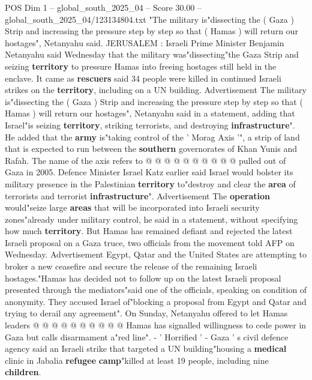 \begin{textsample}{POS Dim 1 – global\_south\_2025\_04 – Score 30.00 – global\_south\_2025\_04/123134804.txt}  \label{ex:f1_pos_284}
"The military is"dissecting the ( Gaza ) Strip and increasing the pressure step by step so that ( Hamas ) will return our hostages", Netanyahu said.
JERUSALEM : Israeli Prime Minister Benjamin Netanyahu said Wednesday that the military was"dissecting"the Gaza Strip and seizing \textbf{territory} to pressure Hamas into freeing hostages still held in the enclave.
It came as \textbf{rescuers} said 34 people were killed in continued Israeli strikes on the \textbf{territory}, including on a UN building.
Advertisement The military is"dissecting the ( Gaza ) Strip and increasing the pressure step by step so that ( Hamas ) will return our hostages", Netanyahu said in a statement, adding that Israel"is seizing \textbf{territory}, striking terrorists, and destroying \textbf{infrastructure}".
He added that the \textbf{army} is"taking control of the ' Morag Axis '", a strip of land that is expected to run between the \textbf{southern} governorates of Khan Yunis and Rafah.
The name of the axis refers to @ @ @ @ @ @ @ @ @ @ pulled out of Gaza in 2005.
Defence Minister Israel Katz earlier said Israel would bolster its military presence in the Palestinian \textbf{territory} to"destroy and clear the \textbf{area} of terrorists and terrorist \textbf{infrastructure}".
Advertisement The \textbf{operation} would"seize large \textbf{areas} that will be incorporated into Israeli security zones"already under military control, he said in a statement, without specifying how much \textbf{territory}.
But Hamas has remained defiant and rejected the latest Israeli proposal on a Gaza truce, two officials from the movement told AFP on Wednesday.
Advertisement Egypt, Qatar and the United States are attempting to broker a new ceasefire and secure the release of the remaining Israeli hostages."Hamas has decided not to follow up on the latest Israeli proposal presented through the mediators"said one of the officials, speaking on condition of anonymity.
They accused Israel of"blocking a proposal from Egypt and Qatar and trying to derail any agreement".
On Sunday, Netanyahu offered to let Hamas leaders @ @ @ @ @ @ @ @ @ @ Hamas has signalled willingness to cede power in Gaza but calls disarmament a"red line". - ' Horrified ' - Gaza ' s civil defence agency said an Israeli strike that targeted a UN building"housing a \textbf{medical} clinic in Jabalia \textbf{refugee} \textbf{camp}"killed at least 19 people, including nine \textbf{children}.

\end{textsample}
